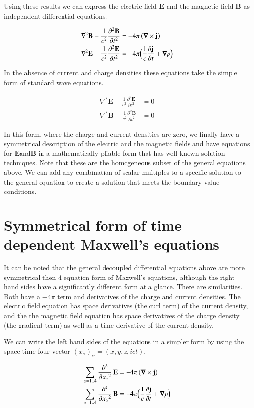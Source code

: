 \documentclass{article}      %
\newcommand{\grad}[0]{\boldsymbol{\nabla}}
\newcommand{\curl}[0]{\grad \times}
\newcommand{\delsquared}[0]{\nabla^2}
\newcommand{\delambert}[1]{\sum_{\alpha = 1 .. 4}{\Dsq{x_\alpha}{#1}}}
\newcommand{\D}[2] {\frac {\partial #2} {\partial #1}}
\newcommand{\Dsq}[2] {\frac {\partial^2 #2} {\partial {#1}^2}}
\newcommand{\Bj}[0]{\mathbf{j}}
\newcommand{\BB}[0]{\mathbf{B}}
\newcommand{\BE}[0]{\mathbf{E}}
\begin{document}
Using these results we can express the 
electric field $\BE$ and the
magnetic field $\BB$
as independent differential equations.

\begin{align*}
\delsquared \BB - \frac{1}{c^2} \Dsq{t}{\BB} &= - 4\pi \left(\curl \Bj\right) \\
\delsquared \BE - \frac{1}{c^2} \Dsq{t}{\BE} &= - 4\pi \Bigl(\frac{1}{c} \D{t}{\Bj} + \grad \rho\Bigr)
\end{align*}

In the absence of current and charge densities these equations take the simple form of standard wave
equations.

\begin{align*}
\delsquared \BE - \frac{1}{c^2} \Dsq{t}{\BE} &= 0 \\
\delsquared \BB - \frac{1}{c^2} \Dsq{t}{\BB} &= 0
\end{align*}

In this form, where the charge and current densities are zero, we finally have 
a symmetrical description of the electric and the magnetic fields and have equations 
for $\BE \text{and} \BB$ in a mathematically pliable form that has well known 
solution techniques.
Note that these are the homogeneous subset of the general equations above.
We can add any combination of scalar multiples to a specific solution 
to the general equation to create a solution that meets the boundary 
value conditions.

\section{Symmetrical form of time dependent Maxwell's equations}

It can 
be noted that the general decoupled differential equations above are more 
symmetrical then 4 equation form of Maxwell's equations, although the
right hand sides have a significantly different form at a glance.  There
are similarities.  Both have a $-4\pi$ term and derivatives of the charge and
current densities.  The electric field equation has space derivatives (the curl term) of 
the current density, and the the magnetic field equation has space derivatives of 
the charge density (the gradient term) as well as a time derivative of the current
density.

We can write the left hand sides of the equations in a simpler form by using the 
space time four vector $(x_\alpha)_\alpha = (x, y, z, ict)$.

\begin{align*}
\delambert{} \,\BE &= - 4\pi \left(\curl \Bj\right) \\
\delambert{} \,\BB &= - 4\pi \Bigl(\frac{1}{c} \D{t}{\Bj} + \grad \rho\Bigr)
\end{align*}
\end{document}
